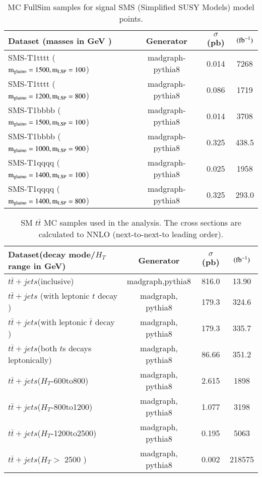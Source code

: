\begin{table}[h]
\centering
\caption{MC FullSim samples for signal SMS (Simplified SUSY Models) model points.}
\label{tab:signalMC}
{\footnotesize
\begin{tabular}{lccc}
\hline \hline
Dataset (masses in GeV ) & Generator & $\sigma$ (pb) & $(\rm fb^{-1})$ \\
\hline
SMS-T1tttt ($\rm m_{gluino}=1500, m_{LSP}=100$) & madgraph-pythia8 & 0.014 & 7268\\
SMS-T1tttt ($\rm m_{gluino}=1200, m_{LSP}=800$) & madgraph-pythia8 & 0.086 & 1719\\
SMS-T1bbbb ($\rm m_{gluino}=1500, m_{LSP}=100$) & madgraph-pythia8 & 0.014 & 3708\\
SMS-T1bbbb ($\rm m_{gluino}=1000, m_{LSP}=900$) & madgraph-pythia8 & 0.325 & 438.5\\
SMS-T1qqqq ($\rm m_{gluino}=1400, m_{LSP}=100$) & madgraph-pythia8 & 0.025 & 1958\\
SMS-T1qqqq ($\rm m_{gluino}=1400, m_{LSP}=800$) & madgraph-pythia8 & 0.325 & 293.0\\
\hline \hline
\end{tabular}
}
\end{table}




\begin{table}[h]
\centering
\caption{SM $t\bar{t}$ MC samples used in the analysis. The cross
  sections are calculated to NNLO (next-to-next-to leading order). }
\label{tab:ttbarMCsamples}
{\footnotesize
\begin{tabular}{lccc}
\hline \hline
Dataset(decay mode/$H_{T}$ range in GeV) & Generator & $\sigma$ (pb) & $ (\rm fb^{-1})$ \\
\hline
$t\bar{t} +jets$(inclusive)  & madgraph,pythia8 & 816.0 & 13.90\\
$t\bar{t} +jets$ (with leptonic $t$ decay  ) & madgraph, pythia8 & 179.3 & 324.6\\
$t\bar{t} +jets$(with leptonic $\bar{t}$ decay ) & madgraph, pythia8 & 179.3 & 335.7\\
$t\bar{t} +jets$(both $t$s decays leptonically) & madgraph, pythia8 & 86.66 & 351.2\\
$t\bar{t} +jets$($H_{T}$-600to800) & madgraph, pythia8 & 2.615 & 1898\\
$t\bar{t} +jets$($H_{T}$-800to1200) & madgraph, pythia8 & 1.077 & 3198\\
$t\bar{t} +jets$($H_{T}$-1200to2500) & madgraph, pythia8 & 0.195 & 5063\\
$t\bar{t} +jets$($H_{T} > $ 2500 ) & madgraph, pythia8 & 0.002 & 218575\\
\hline \hline
\end{tabular}
}
\end{table}

